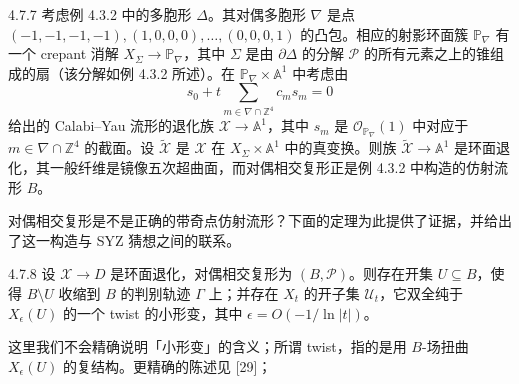 \begin{example}{4.7.7}
考虑例 4.3.2 中的多胞形 $\Delta$。其对偶多胞形 $\nabla$ 是点 $(-1,-1,-1,-1),(1,0,0,0),\dots,(0,0,0,1)$ 的凸包。相应的射影环面簇 $\mathbb{P}_\nabla$ 有一个 crepant 消解 $X_\Sigma\to\mathbb{P}_\nabla$，其中 $\Sigma$ 是由 $\partial\Delta$ 的分解 $\mathcal{P}$ 的所有元素之上的锥组成的扇（该分解如例 4.3.2 所述）。在 $\mathbb{P}_\nabla\times\mathbb{A}^1$ 中考虑由
\[
s_0+t\sum_{m\in\nabla\cap\mathbb{Z}^4}c_ms_m=0
\]
给出的 Calabi--Yau 流形的退化族 $\mathcal{X}\to\mathbb{A}^1$，其中 $s_m$ 是 $\mathcal{O}_{\mathbb{P}_\nabla}(1)$ 中对应于 $m\in\nabla\cap\mathbb{Z}^4$ 的截面。设 $\widetilde{\mathcal{X}}$ 是 $\mathcal{X}$ 在 $X_\Sigma\times\mathbb{A}^1$ 中的真变换。则族 $\widetilde{\mathcal{X}}\to\mathbb{A}^1$ 是环面退化，其一般纤维是镜像五次超曲面，而对偶相交复形正是例 4.3.2 中构造的仿射流形 $B$。
\end{example}

对偶相交复形是不是正确的带奇点仿射流形？下面的定理为此提供了证据，并给出了这一构造与 SYZ 猜想之间的联系。

\begin{theorem}{4.7.8}
设 $\mathcal{X}\to D$ 是环面退化，对偶相交复形为 $(B,\mathcal{P})$。则存在开集 $U\subseteq B$，使得 $B\setminus U$ 收缩到 $B$ 的判别轨迹 $\Gamma$ 上；并存在 $X_t$ 的开子集 $\mathcal{U}_t$，它双全纯于 $X_\epsilon(U)$ 的一个 twist 的小形变，其中 $\epsilon=O(-1/\ln|t|)$。
\end{theorem}

这里我们不会精确说明「小形变」的含义；所谓 twist，指的是用 $B$-场扭曲 $X_\epsilon(U)$ 的复结构。更精确的陈述见 [29]；
